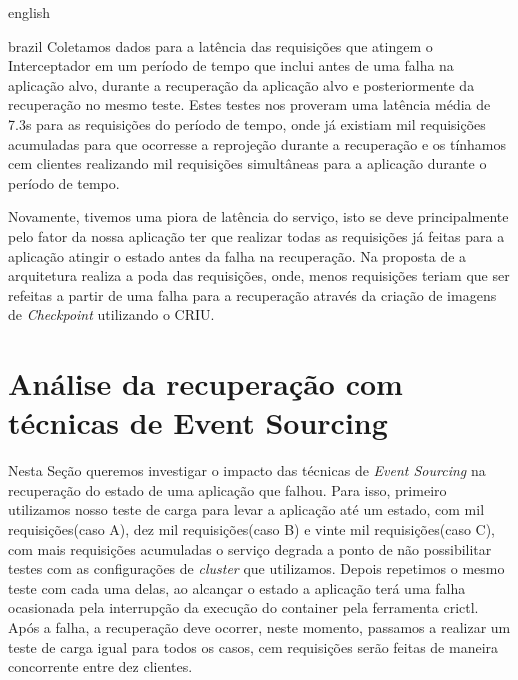 \begin{otherlanguage*}{english}
\begin{otherlanguage*}{brazil}
Coletamos dados para a latência das requisições que atingem o Interceptador em um período de
tempo que inclui antes de uma falha na aplicação alvo, durante a recuperação da aplicação
alvo e posteriormente da recuperação no mesmo teste. Estes testes nos proveram uma latência
média de 7.3s para as requisições do período de tempo, onde já existiam mil requisições
acumuladas para que ocorresse a reprojeção durante a recuperação e os tínhamos cem clientes
realizando mil requisições simultâneas para a aplicação durante o período de tempo.

Novamente, tivemos uma piora de latência do serviço, isto se deve principalmente pelo fator
da nossa aplicação ter que realizar todas as requisições já feitas para a aplicação atingir
o estado antes da falha na recuperação. Na proposta de \cite{muller2022architecture} a
arquitetura realiza a poda das requisições, onde, menos requisições teriam que ser refeitas
a partir de uma falha para a recuperação através da criação de imagens de \textit{Checkpoint}
utilizando o CRIU.

\section{Análise da recuperação com técnicas de Event Sourcing}

Nesta Seção queremos investigar o impacto das técnicas de \textit{Event Sourcing} na
recuperação do estado de uma aplicação que falhou. Para isso, primeiro utilizamos nosso teste
de carga para levar a aplicação até um estado, com mil requisições(caso A), dez mil
requisições(caso B) e vinte mil requisições(caso C), com mais requisições acumuladas o serviço
degrada a ponto de não possibilitar testes com as configurações de \textit{cluster} que utilizamos.
Depois repetimos o mesmo teste com cada uma delas, ao alcançar o estado a aplicação terá uma falha
ocasionada pela interrupção da execução do container pela ferramenta crictl. Após a falha,
a recuperação deve ocorrer, neste momento, passamos a realizar um teste de carga igual para
todos os casos, cem requisições serão feitas de maneira concorrente entre dez clientes.


\end{otherlanguage*}
\end{otherlanguage*}
